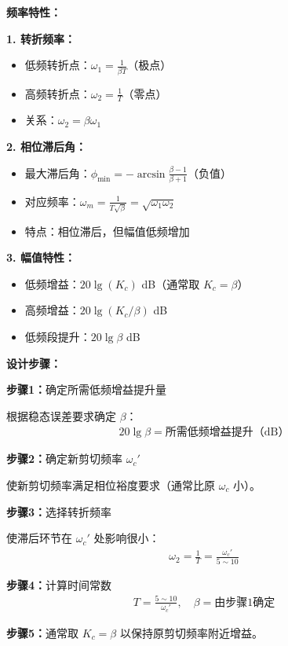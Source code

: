 \begin{minipage}[t]{0.52\textwidth}
\textbf{频率特性：}

\textbf{1. 转折频率：}
\begin{itemize}
    \item 低频转折点：$\omega_1 = \frac{1}{\beta T}$（极点）
    \item 高频转折点：$\omega_2 = \frac{1}{T}$（零点）
    \item 关系：$\omega_2 = \beta \omega_1$
\end{itemize}

\textbf{2. 相位滞后角：}
\begin{itemize}
    \item 最大滞后角：$\phi_{\min} = -\arcsin\frac{\beta - 1}{\beta + 1}$（负值）
    \item 对应频率：$\omega_m = \frac{1}{T\sqrt{\beta}} = \sqrt{\omega_1 \omega_2}$
    \item 特点：相位滞后，但幅值低频增加
\end{itemize}

\textbf{3. 幅值特性：}
\begin{itemize}
    \item 低频增益：$20\lg(K_c)$ dB（通常取 $K_c = \beta$）
    \item 高频增益：$20\lg(K_c / \beta)$ dB
    \item 低频段提升：$20\lg\beta$ dB
\end{itemize}

\vspace{0.3cm}
\textbf{设计步骤：}

\textbf{步骤1：}确定所需低频增益提升量

根据稳态误差要求确定 $\beta$：
\begin{align*}
20\lg\beta = \text{所需低频增益提升（dB）}
\end{align*}

\textbf{步骤2：}确定新剪切频率 $\omega_c'$

使新剪切频率满足相位裕度要求（通常比原 $\omega_c$ 小）。

\textbf{步骤3：}选择转折频率

使滞后环节在 $\omega_c'$ 处影响很小：
\begin{align*}
\omega_2 = \frac{1}{T} = \frac{\omega_c'}{5 \sim 10}
\end{align*}

\textbf{步骤4：}计算时间常数
\begin{align*}
T = \frac{5 \sim 10}{\omega_c'}, \quad \beta = \text{由步骤1确定}
\end{align*}

\textbf{步骤5：}通常取 $K_c = \beta$ 以保持原剪切频率附近增益。

\end{minipage}\hfill
